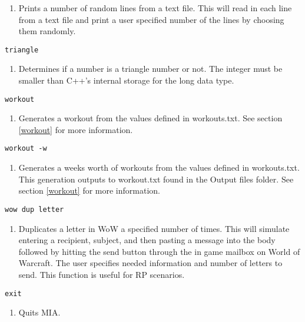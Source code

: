 \begin{enumerate}
	\item[]  Prints a number of random lines from a text file. This will read in each line from a text file and print a user specified number of the lines by choosing them randomly.
\end{enumerate}
\begin{lstlisting} 
triangle   
\end{lstlisting}
\begin{enumerate}
	\item[] Determines if a number is a triangle number or not. The integer must be smaller than C++'s internal storage for the long data type.
\end{enumerate}
\begin{lstlisting} 
workout
\end{lstlisting}
\begin{enumerate}
	\item[] Generates a workout from the values defined in workouts.txt. See section \ref{workout} for more information.
\end{enumerate}
\begin{lstlisting} 
workout -w
\end{lstlisting}
\begin{enumerate}
	\item[] Generates a weeks worth of workouts from the values defined in workouts.txt. This generation outputs to workout.txt found in the Output files folder. See section \ref{workout} for more information.
\end{enumerate}
\begin{lstlisting} 
wow dup letter
\end{lstlisting}
\begin{enumerate}
	\item[] Duplicates a letter in WoW a specified number of times. This will simulate entering a recipient, subject, and then pasting a message into the body followed by hitting the send button through the in game mailbox on World of Warcraft. The user specifies needed information and number of letters to send. This function is useful for RP scenarios.
\end{enumerate}
\begin{lstlisting} 
exit  
\end{lstlisting}
\begin{enumerate}
	\item[] Quits MIA. 
\end{enumerate}